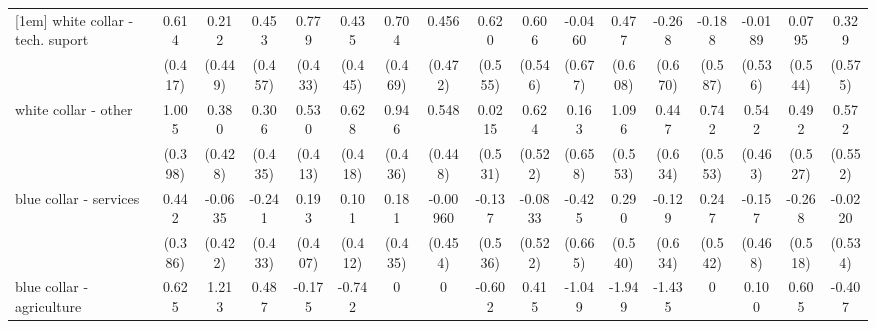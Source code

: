 {\begin{tabular}{l*{16}{c}}
[1em]
white collar - tech. suport&       0.614         &       0.212         &       0.453         &       0.779         &       0.435         &       0.704         &       0.456         &       0.620         &       0.606         &     -0.0460         &       0.477         &      -0.268         &      -0.188         &     -0.0189         &      0.0795         &       0.329         \\
                    &     (0.417)         &     (0.449)         &     (0.457)         &     (0.433)         &     (0.445)         &     (0.469)         &     (0.472)         &     (0.555)         &     (0.546)         &     (0.677)         &     (0.608)         &     (0.670)         &     (0.587)         &     (0.536)         &     (0.544)         &     (0.575)         \\
[1em]
white collar - other&       1.005\sym{*}  &       0.380         &       0.306         &       0.530         &       0.628         &       0.946\sym{*}  &       0.548         &      0.0215         &       0.624         &       0.163         &       1.096\sym{*}  &       0.447         &       0.742         &       0.542         &       0.492         &       0.572         \\
                    &     (0.398)         &     (0.428)         &     (0.435)         &     (0.413)         &     (0.418)         &     (0.436)         &     (0.448)         &     (0.531)         &     (0.522)         &     (0.658)         &     (0.553)         &     (0.634)         &     (0.553)         &     (0.463)         &     (0.527)         &     (0.552)         \\
[1em]
blue collar - services&       0.442         &     -0.0635         &      -0.241         &       0.193         &       0.101         &       0.181         &    -0.00960         &      -0.137         &     -0.0833         &      -0.425         &       0.290         &      -0.129         &       0.247         &      -0.157         &      -0.268         &     -0.0220         \\
                    &     (0.386)         &     (0.422)         &     (0.433)         &     (0.407)         &     (0.412)         &     (0.435)         &     (0.454)         &     (0.536)         &     (0.522)         &     (0.665)         &     (0.540)         &     (0.634)         &     (0.542)         &     (0.468)         &     (0.518)         &     (0.534)         \\
[1em]
blue collar - agriculture&       0.625         &       1.213         &       0.487         &      -0.175         &      -0.742         &           0         &           0         &      -0.602         &       0.415         &      -1.049         &      -1.949         &      -1.435         &           0         &       0.100         &       0.605         &      -0.407         \\

\end{tabular}}
